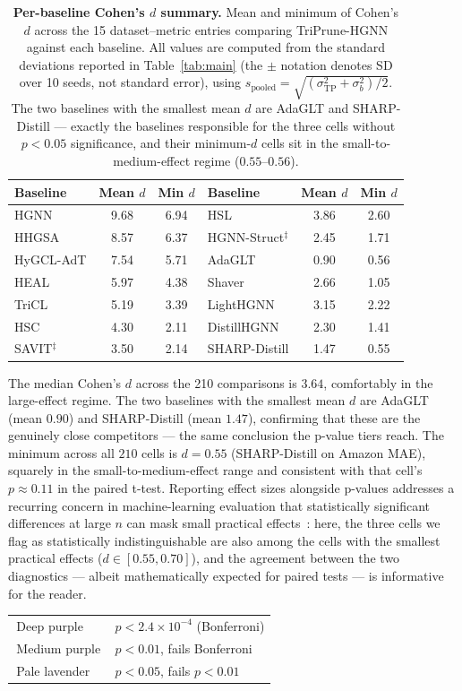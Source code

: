 \documentclass[10pt]{article}
\theoremstyle{plain}
\theoremstyle{definition}
\begin{document}
\begin{table}[ht!]
\centering
\caption{\textbf{Per-baseline Cohen's $d$ summary.} Mean and minimum of Cohen's $d$ across the 15 dataset--metric entries comparing TriPrune-HGNN against each baseline. All values are computed from the standard deviations reported in Table~\ref{tab:main} (the $\pm$ notation denotes SD over 10 seeds, not standard error), using $s_{\mathrm{pooled}}\!=\!\sqrt{(\sigma_{\mathrm{TP}}^{2}+\sigma_{b}^{2})/2}$. The two baselines with the smallest mean $d$ are AdaGLT and SHARP-Distill --- exactly the baselines responsible for the three cells without $p<0.05$ significance, and their minimum-$d$ cells sit in the small-to-medium-effect regime ($0.55$--$0.56$).}
\label{tab:effect_sizes}
\setlength{\tabcolsep}{6pt}
\renewcommand{\arraystretch}{1.1}
\small
\begin{tabular}{l cc l cc}
\toprule
\textbf{Baseline} & \textbf{Mean $d$} & \textbf{Min $d$} & \textbf{Baseline} & \textbf{Mean $d$} & \textbf{Min $d$} \\
\midrule
HGNN              & 9.68 & 6.94 & HSL                       & 3.86 & 2.60 \\
HHGSA             & 8.57 & 6.37 & HGNN-Struct$^{\ddagger}$  & 2.45 & 1.71 \\
HyGCL-AdT         & 7.54 & 5.71 & AdaGLT                    & 0.90 & 0.56 \\
HEAL              & 5.97 & 4.38 & Shaver                    & 2.66 & 1.05 \\
TriCL             & 5.19 & 3.39 & LightHGNN                 & 3.15 & 2.22 \\
HSC               & 4.30 & 2.11 & DistillHGNN               & 2.30 & 1.41 \\
SAVIT$^{\ddagger}$ & 3.50 & 2.14 & SHARP-Distill            & 1.47 & 0.55 \\
\bottomrule
\end{tabular}
\end{table}

The median Cohen's $d$ across the 210 comparisons is $3.64$, comfortably in the large-effect regime. The two baselines with the smallest mean $d$ are AdaGLT (mean $0.90$) and SHARP-Distill (mean $1.47$), confirming that these are the genuinely close competitors --- the same conclusion the p-value tiers reach. The minimum across all $210$ cells is $d\!=\!0.55$ (SHARP-Distill on Amazon MAE), squarely in the small-to-medium-effect range and consistent with that cell's $p\!\approx\!0.11$ in the paired t-test. Reporting effect sizes alongside p-values addresses a recurring concern in machine-learning evaluation that statistically significant differences at large $n$ can mask small practical effects~\citep{benavoli2017time}: here, the three cells we flag as statistically indistinguishable are also among the cells with the smallest practical effects ($d\!\in\![0.55,0.70]$), and the agreement between the two diagnostics --- albeit mathematically expected for paired tests --- is informative for the reader.

\begin{center}
\small
\begin{tabular}{ll}
\cellcolor{tierBonf}\,Deep purple\,    & $p<2.4\!\times\!10^{-4}$ (Bonferroni) \\
\cellcolor{tier01}\,Medium purple\,    & $p<0.01$, fails Bonferroni \\
\cellcolor{tier05}\,Pale lavender\,    & $p<0.05$, fails $p<0.01$ \\
\end{tabular}
\end{center}
\end{document}
